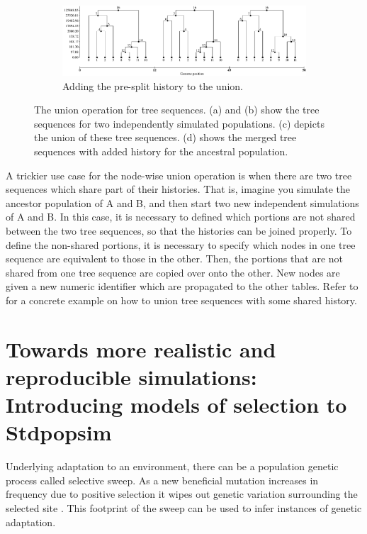\begin{figure}
\begin{subfigure}[b]{0.9\textwidth}
\includegraphics[width=\linewidth]{union_example/tsu_recap.pdf}
\caption{Adding the pre-split history to the union.}\label{fig:tsu_recap}
\end{subfigure}

\caption[The union operation for tree sequences]{The union operation for tree sequences.
(a) and (b) show the tree sequences for two independently simulated populations.
(c) depicts the union of these tree sequences.
(d) shows the merged tree sequences with added history for the ancestral population.}
\label{fig:union_op}
\end{figure}

A trickier use case for the node-wise union operation is when there are two tree sequences which share part of their histories.
That is, imagine you simulate the ancestor population of A and B, and then start two new independent simulations of A and B.
In this case, it is necessary to defined which portions are not shared between the two tree sequences,
so that the histories can be joined properly.
To define the non-shared portions, it is necessary to specify which nodes in one tree sequence are equivalent to those in the other.
Then, the portions that are not shared from one tree sequence are copied over onto the other.
New nodes are given a new numeric identifier which are propagated to the other tables.
Refer to \citet{rodrigues_vignette_2021} for a concrete example on how to union tree sequences with some shared history.

\section{Towards more realistic and reproducible simulations: Introducing models of selection to Stdpopsim}

Underlying adaptation to an environment, there can be a population genetic process called selective sweep.
As a new beneficial mutation increases in frequency due to positive selection it wipes out genetic variation surrounding the selected site \citep{smith_hitch-hiking_1974, kaplan_hitchhiking_1989}.
This footprint of the sweep can be used to infer instances of genetic adaptation.

